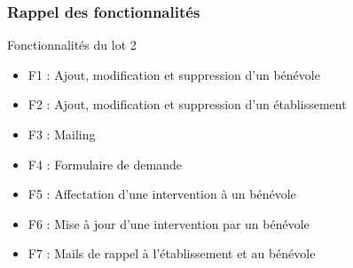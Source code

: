 \speaker{\Francois}

\begin{frame}
\frametitle{Rappel des fonctionnalités}
\begin{block}{Fonctionnalités du lot 2}
	\begin{itemize}
		\item F1 : Ajout, modification et suppression d'un bénévole
		\item F2 : Ajout, modification et suppression d'un établissement
		\item F3 : Mailing
		\item F4 : Formulaire de demande
		\item F5 : Affectation d'une intervention à un bénévole
		\item F6 : Mise à jour d'une intervention par un bénévole
		\item F7 : Mails de rappel à l'établissement et au bénévole
	\end{itemize}
\end{block}
\end{frame}
